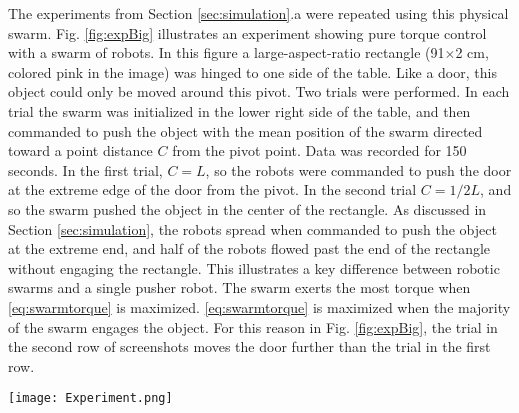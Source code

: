 The experiments from Section \ref{sec:simulation}.a were repeated using this physical swarm.
Fig. \ref{fig:expBig} illustrates an experiment showing pure torque control with a swarm of robots. In this figure a large-aspect-ratio rectangle  (91$\times$2 cm, colored pink in the image) was hinged to one side of the table.  Like a door, this object could only be moved around this pivot. 
Two trials were performed.  In each trial the swarm was initialized in the lower right side of the table, and then commanded to push the object with the mean position of the swarm directed toward a point distance $C$ from the pivot point. Data was recorded for 150 seconds.
In the first trial, $C = L$, so the robots were commanded to push the door at the extreme edge of the door from the pivot.  
In the second trial $C = 1/2 L$, and so the swarm pushed the object in the center of the rectangle.
As discussed in Section \ref{sec:simulation}, the robots spread when commanded to push the object at the extreme end, and half of the robots flowed past the end of the rectangle without engaging the rectangle.
 This illustrates a key difference between robotic swarms and a single pusher robot. The swarm exerts the most torque when  \eqref{eq:swarmtorque} is maximized.
  \eqref{eq:swarmtorque} is maximized when the majority of the swarm engages the object.
For this reason in Fig. \ref{fig:expBig}, the trial in the second row of screenshots moves the door further than the  trial in the  first row.
\begin{figure*}
\centering

\texttt{[image: Experiment.png]}
\vspace{-1em}
\caption{\label{fig:expBig}{Snapshots showing the effect of pushing a pivoted rectangular object at different distances from the pivot point. 
 97 robots were programmed to move toward the brightest light in the room, and   controlled by choosing which of 8 lights were on at any given instant. The top row of snapshots illustrate the swarm pushing at the end of the object.  In this case,  the swarm flows past the object and the force decreases. The bottom row illustrates that when the swarm pushes at the middle of the object the force provided by the swarm remains constant. In this case the swarm does not flow past the object. See video attachment for recordings of these experiments at\href{https://www.youtube.com/watch?v=ZiKEa5UwukM&feature=youtu.be}{\cite{ShahrokhiTorqueVideo}}.
 }
}
\end{figure*}






